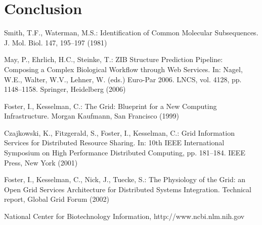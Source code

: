 \documentclass[lnbip]{svmultln}
\begin{document}
\section{Conclusion}
\label{sec:conclusion}

%
%
\begin{thebibliography}{5}

 Smith, T.F., Waterman, M.S.: Identification of Common Molecular
Subsequences. J. Mol. Biol. 147, 195--197 (1981)

 May, P., Ehrlich, H.C., Steinke, T.: ZIB Structure Prediction Pipeline:
Composing a Complex Biological Workflow through Web Services. In: Nagel,
W.E., Walter, W.V., Lehner, W. (eds.) Euro-Par 2006. LNCS, vol. 4128,
pp. 1148--1158. Springer, Heidelberg (2006)

 Foster, I., Kesselman, C.: The Grid: Blueprint for a New Computing
Infrastructure. Morgan Kaufmann, San Francisco (1999)

 Czajkowski, K., Fitzgerald, S., Foster, I., Kesselman, C.: Grid
Information Services for Distributed Resource Sharing. In: 10th IEEE
International Symposium on High Performance Distributed Computing, pp.
181--184. IEEE Press, New York (2001)

 Foster, I., Kesselman, C., Nick, J., Tuecke, S.: The Physiology of the
Grid: an Open Grid Services Architecture for Distributed Systems
Integration. Technical report, Global Grid Forum (2002)

 National Center for Biotechnology Information, http://www.ncbi.nlm.nih.gov

\end{thebibliography}
%
\end{document}
